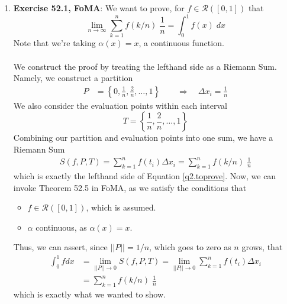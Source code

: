 \documentclass[12pt]{article}
\theoremstyle{plain}
\theoremstyle{definition}
\theoremstyle{remark}
\begin{document}
\begin{enumerate}
\newpage
\item \textbf{Exercise 52.1, FoMA}: We want to prove, for $f \in \mathscr{R}([0,1])$ that
\begin{equation}
    \label{q2.toprove}
    \lim_{n\rightarrow\infty} \sum^n_{k=1} f(k/n)\;
        \frac{1}{n} = \int^1_0 f(x) \; dx
\end{equation}
Note that we're taking $\alpha(x) = x$, a continuous function.
\\
\\
We construct the proof by treating the lefthand side as a Riemann Sum. Namely, we construct a partition
\begin{align*}
    P &= \left\{0, \frac{1}{n}, \frac{2}{n}, \ldots, 1\right\} 
    \qquad 
    \Rightarrow \quad \Delta x_i = \frac{1}{n}
\end{align*}
We also consider the evaluation points within each interval
\begin{equation}
    T = \left\{\frac{1}{n}, \frac{2}{n}, \ldots, 1\right\} 
\end{equation}
Combining our partition and evaluation points into one sum, we have a Riemann Sum
\begin{align*}
    S(f,P,T) = \sum^n_{k=1} f(t_i) \Delta x_i = 
        \sum^n_{k=1} f(k/n)\;
        \frac{1}{n}
\end{align*}
which is exactly the lefthand side of Equation \ref{q2.toprove}. Now, we can invoke Theorem 52.5 in FoMA, as we satisfy the conditions that
\begin{itemize}
    \item $f \in \mathscr{R}([0,1])$, which is assumed. 
    \item $\alpha$ continuous, as $\alpha(x)=x$.
\end{itemize}
Thus, we can assert, since $||P|| = 1/n$, which goes to zero as $n$ grows, that
\begin{align*}
    \int^1_0 f dx &= \lim_{||P||\rightarrow 0} S(f,P,T) 
    = \lim_{||P||\rightarrow 0} \sum^n_{k=1} f(t_i) \Delta x_i\\
    &= \sum^n_{k=1} f(k/n)\; \frac{1}{n}
\end{align*}
which is exactly what we wanted to show.


\end{enumerate}
\end{document}
